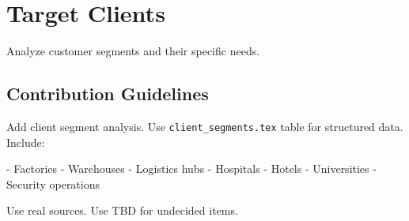 \chapter{Target Clients}

Analyze customer segments and their specific needs.

\section{Contribution Guidelines}

Add client segment analysis. Use \texttt{client\_segments.tex} table for structured data. Include:

- Factories
- Warehouses
- Logistics hubs
- Hospitals
- Hotels
- Universities
- Security operations

Use real sources. Use TBD for undecided items.

